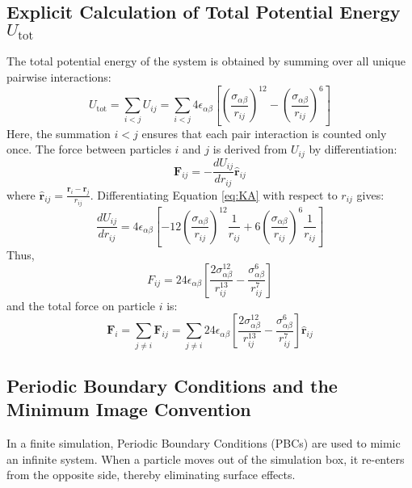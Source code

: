 \documentclass{article}
\begin{document}
\subsection{Explicit Calculation of Total Potential Energy \(U_{\text{tot}}\)}
The total potential energy of the system is obtained by summing over all unique pairwise interactions:
\begin{equation} \label{eq:Utot}
    U_{\text{tot}} = \sum_{i<j} U_{ij} = \sum_{i<j} 4\epsilon_{\alpha\beta} \left[ \left(\frac{\sigma_{\alpha\beta}}{r_{ij}}\right)^{12} - \left(\frac{\sigma_{\alpha\beta}}{r_{ij}}\right)^{6} \right]
\end{equation}
Here, the summation \(i<j\) ensures that each pair interaction is counted only once.
The force between particles \(i\) and \(j\) is derived from \(U_{ij}\) by differentiation:
\begin{equation}
    \mathbf{F}_{ij} = -\frac{d U_{ij}}{d r_{ij}} \hat{\mathbf{r}}_{ij}
\end{equation}
where \( \hat{\mathbf{r}}_{ij} = \frac{\mathbf{r}_i - \mathbf{r}_j}{r_{ij}} \). Differentiating Equation \eqref{eq:KA} with respect to \(r_{ij}\) gives:
\begin{equation}
    \frac{d U_{ij}}{d r_{ij}} = 4\epsilon_{\alpha\beta} \left[-12 \left(\frac{\sigma_{\alpha\beta}}{r_{ij}}\right)^{12} \frac{1}{r_{ij}} + 6 \left(\frac{\sigma_{\alpha\beta}}{r_{ij}}\right)^{6} \frac{1}{r_{ij}}\right]
\end{equation}
Thus,
\begin{equation}
    F_{ij} = 24 \epsilon_{\alpha\beta} \left[\frac{2\sigma_{\alpha\beta}^{12}}{r_{ij}^{13}} - \frac{\sigma_{\alpha\beta}^{6}}{r_{ij}^{7}} \right]
\end{equation}
and the total force on particle \(i\) is:
\begin{equation}
    \mathbf{F}_i = \sum_{j \neq i} \mathbf{F}_{ij} = \sum_{j \neq i} 24 \epsilon_{\alpha\beta} \left[\frac{2\sigma_{\alpha\beta}^{12}}{r_{ij}^{13}} - \frac{\sigma_{\alpha\beta}^{6}}{r_{ij}^{7}} \right] \hat{\mathbf{r}}_{ij}
\end{equation}

\subsection{Periodic Boundary Conditions and the Minimum Image Convention}
In a finite simulation, Periodic Boundary Conditions (PBCs) are used to mimic an infinite system. When a particle moves out of the simulation box, it re-enters from the opposite side, thereby eliminating surface effects.
\end{document}
